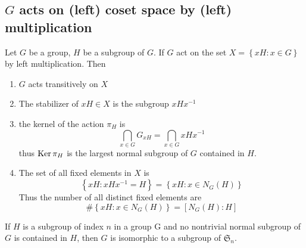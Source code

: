 \subsection{$G$ acts on (left) coset space by (left) multiplication}
\begin{theorem}
    \label{thm: $G$ act on the set $X$ of left cosets of $H$ in $G$ by left multiplication}
    Let $G$ be a group, $H$ be a subgroup of $G$. If $G$ act on the set $X=\left\{xH: x\in G\right\}$ by left multiplication. Then
    \begin{enumerate}
        \item
              $G$ acts transitively on $X$

        \item
              The stabilizer of $xH \in X$ is the subgroup $xHx^{-1}$

        \item
              the kernel of the action $\pi_H$ is
              \begin{equation*}
                  \bigcap_{x\in G} G_{xH}
                  =
                  \bigcap_{x \in G} x H x^{-1}
              \end{equation*}
              thus $\operatorname{\operatorname{Ker}} \pi_H$ is the largest normal subgroup of $G$ contained in $H$.

        \item
              The set of all fixed elements in $X$ is
              \begin{equation*}
                  \left\{xH:xHx^{-1}=H\right\}
                  =
                  \left\{xH:x\in N_G(H)\right\}
              \end{equation*}
              Thus the number of all distinct fixed elements are
              \begin{equation*}
                  \#\left\{xH:x\in N_G(H)\right\}
                  =
                  \left[N_G(H):H\right]
              \end{equation*}
    \end{enumerate}
\end{theorem}
\begin{corollary}
    If $H$ is a subgroup of index $n$ in a group G and no nontrivial normal subgroup of $G$ is contained in $H$, then $G$ is isomorphic to a subgroup of $\mathfrak{S}_n$.
\end{corollary}
